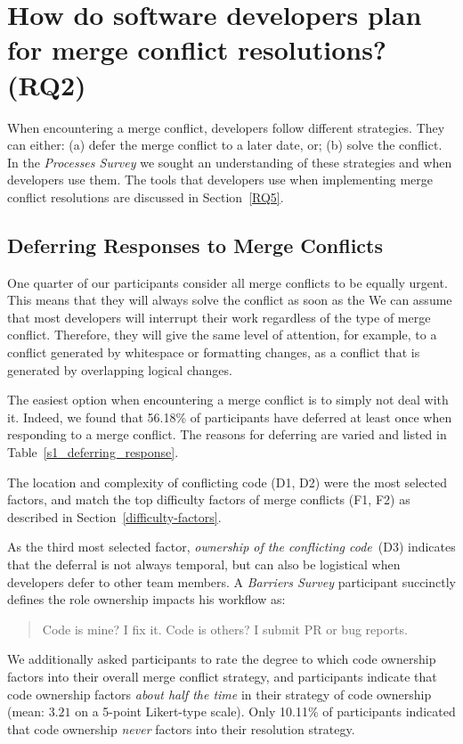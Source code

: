 
\section{How do software developers \textbf{plan} for merge conflict resolutions? (RQ2)}\label{RQ2}

When encountering a merge conflict, developers follow different strategies.
They can either: (a) defer the merge conflict to a later date, or; (b) solve the conflict.
In the \textit{Processes Survey} we sought an understanding of these strategies and when developers use them.
The tools that developers use when implementing merge conflict resolutions are discussed in Section~\ref{RQ5}.

\subsection{Deferring Responses to Merge Conflicts}

One quarter of our participants consider all merge conflicts to be equally urgent.
This means that they will always solve the conflict as soon as the 
We can assume that most developers will interrupt their work regardless of the type of merge conflict.
Therefore, they will give the same level of attention, for example, to a conflict generated by whitespace or formatting changes, as a conflict that is generated by overlapping logical changes. 

The easiest option when encountering a merge conflict is to simply not deal with it.
Indeed, we found that 56.18\% of participants have deferred at least once when responding to a merge conflict.
The reasons for deferring are varied and listed in Table~\ref{s1_deferring_response}.

The location and complexity of conflicting code (D1, D2) were the most selected factors, and match the top difficulty factors of merge conflicts (F1, F2) as described in Section~\ref{difficulty-factors}.

As the third most selected factor, \textit{ownership of the conflicting code}~(D3) indicates that the deferral is not always temporal, but can also be logistical when developers defer to other team members.
A \textit{Barriers Survey} participant succinctly defines the role ownership impacts his workflow as:
\begin{quotation}
	Code is mine? I fix it. Code is others? I submit PR or bug reports.
\end{quotation}
We additionally asked participants to rate the degree to which code ownership factors into their overall merge conflict strategy, and participants indicate that code ownership factors \textit{about half the time} in their strategy of code ownership (mean: $3.21$ on a 5-point Likert-type scale).
Only 10.11\% of participants indicated that code ownership \textit{never} factors into their resolution strategy.

